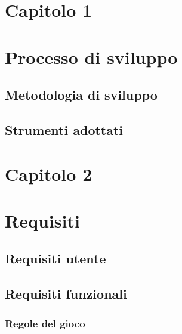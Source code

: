 \date{%
    \small{Paradigmi di Programmazione e Sviluppo}\\%
    \small{Anni accademici 2017--2018 e 2018--2019}
}




    \maketitle
    \clearpage
	\tableofcontents
	\clearpage
    \section*{\Huge {Capitolo 1}\label{chapter1}}
      \section{Processo di sviluppo}\label{sec:process}
        \subsection {Metodologia di sviluppo}\label{subsec:metodology}
        \subsection {Strumenti adottati}\label{subsec:tools}

        \clearpage

    \section*{\Huge {\textbf Capitolo 2}\label{chapter2}}
    \section{Requisiti}\label{sec:requirements}
         \subsection {Requisiti utente}\label{subsec:requirements:business}
             \subsection {Requisiti funzionali}\label{subsec:requirements:functional}
            \subsubsection[Gioco]{\large {Regole del gioco}\label{subsub:requirements:game}}
